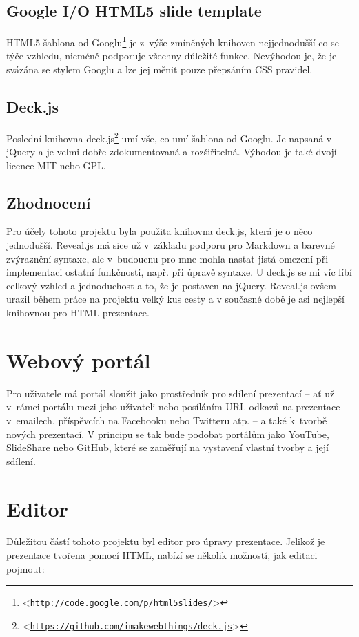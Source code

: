 \documentclass[11pt,twoside,a4paper]{book}
\let\oldUrl\url									%
\renewcommand\url[1]{<\texttt{\oldUrl{#1}}>}
\begin{document}
\subsection{Google I/O HTML5 slide template}
HTML5 šablona od Googlu\footnote{\url{http://code.google.com/p/html5slides/}} je z~výše zmíněných knihoven nejjednodušší co se týče vzhledu, nicméně podporuje všechny
důležité funkce. Nevýhodou je, že je svázána se stylem Googlu a lze jej měnit pouze přepsáním CSS pravidel.

\subsection{Deck.js}
Poslední knihovna deck.js\footnote{\url{https://github.com/imakewebthings/deck.js}} umí vše, co umí šablona od Googlu. Je napsaná v jQuery a je velmi dobře zdokumentovaná a rozšiřitelná. Výhodou je také dvojí licence MIT nebo GPL.

\subsection{Zhodnocení}
Pro účely tohoto projektu byla použita knihovna deck.js, která je o něco jednodušší. Reveal.js má sice už v~základu podporu pro Markdown a barevné zvýraznění syntaxe, ale v~budoucnu pro mne mohla nastat jistá omezení při implementaci ostatní funkčnosti, např. při úpravě syntaxe. U deck.js se mi víc líbí celkový vzhled a jednoduchost a to, že je postaven na jQuery. Reveal.js ovšem urazil během práce na projektu velký kus cesty a v současné době je asi nejlepší knihovnou pro HTML prezentace.


\section{Webový portál}
Pro uživatele má portál sloužit jako prostředník pro sdílení prezentací – ať už v~rámci portálu mezi jeho uživateli nebo
posíláním URL odkazů na prezentace v~emailech, příspěvcích na Facebooku nebo Twitteru atp. – a také k~tvorbě nových
prezentací. V principu se tak bude podobat portálům jako YouTube, SlideShare nebo GitHub, které se zaměřují na vystavení vlastní tvorby a její sdílení.

\section{Editor}
Důležitou částí tohoto projektu byl editor pro úpravy prezentace. Jelikož je prezentace tvořena pomocí HTML, nabízí se
několik možností, jak editaci pojmout:
\end{document}
